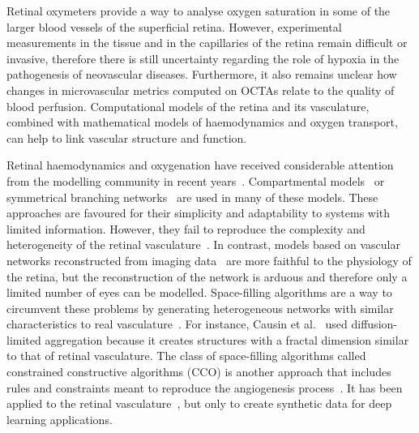 \documentclass[11pt,]{article}
\begin{document}
Retinal oxymeters provide a way to analyse oxygen saturation in some of the larger blood vessels of the superficial retina.
However, experimental measurements in the tissue and in the capillaries of the retina remain difficult or invasive, therefore there is still uncertainty regarding the role of hypoxia in the pathogenesis of neovascular diseases.
Furthermore, it also remains unclear
how changes in microvascular metrics computed on OCTAs relate to the
quality of blood perfusion. Computational models of the retina and its
vasculature, combined with mathematical models of haemodynamics and
oxygen transport, can help to link vascular structure and function.

Retinal haemodynamics and oxygenation have received considerable
attention from the modelling community in recent
years~\cite{Arciero2008,Bernabeu2014,Causin2016,Chiaravalli2022,DoblhoffDier2014,
  Fry2020,Guidoboni2014,Hernandez2023,Takahashi2009,Zhu2019,Yu2019}.
Compartmental models~\cite{Arciero2008,Guidoboni2014,Chiaravalli2022}
or symmetrical branching
networks~\cite{Chiaravalli2022,Takahashi2009,Zhu2019} are used in many
of these models. These approaches are favoured for their simplicity
and adaptability to systems with limited information. However, they
fail to reproduce the complexity and heterogeneity of the retinal
vasculature~\cite{Yu2019}. In contrast, models based on vascular
networks reconstructed from imaging data~\cite{Bernabeu2014,Fry2020}
are more faithful to the physiology of the retina, but the
reconstruction of the network is arduous and therefore only a limited
number of eyes can be modelled. Space-filling algorithms are a way to
circumvent these problems by generating heterogeneous networks with
similar characteristics to real
vasculature~\cite{Causin2016,Linninger2013,Talou2021}. For instance,
Causin et al.~\cite{Causin2016} used diffusion-limited aggregation because it creates structures with a fractal dimension similar to that of retinal vasculature.
The class of space-filling algorithms called constrained constructive algorithms
(CCO) is another approach that includes rules and constraints meant to
reproduce the angiogenesis process~\cite{Linninger2013,Talou2021}. It
has been applied to the retinal
vasculature~\cite{Brown2023,LoCastro2020}, but only to create
synthetic data for deep learning applications.
\end{document}
